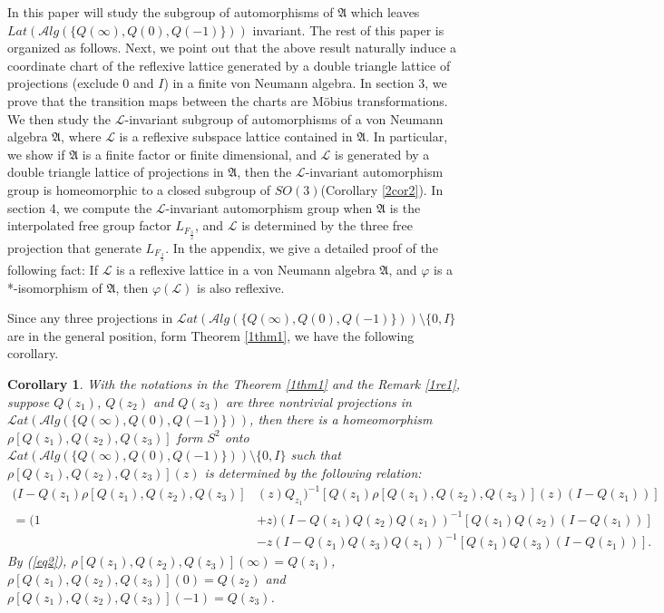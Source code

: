 \documentclass[a4paper,10pt]{amsart}
\newtheorem{corollary}{Corollary}[section]
\newcommand{\AAA}{\mathfrak A}
\newcommand{\LLL}{\mathcal L} %
\newcommand{\Lat}{\mathcal Lat}
\newcommand{\Alg}{\mathcal Alg}
\begin{document}
In this paper will study the subgroup of automorphisms of $\AAA$ which leaves $Lat(\Alg(\{Q(\infty), Q(0), Q(-1)\}))$ invariant.
The rest of this paper is organized as follows.  
Next, we point out that the above result naturally 
induce a coordinate chart of 
the reflexive lattice generated by a double triangle lattice of projections (exclude $0$ and $I$) in a finite von Neumann algebra.
In section 3, we prove that the transition maps between the charts are  
M\"{o}bius transformations.
We then study the $\LLL$-invariant subgroup of automorphisms of  a von Neumann algebra $\AAA$, where $\LLL$ is a
reflexive subspace lattice contained in $\AAA$. In particular, 
we show if $\AAA$ is a finite factor or finite dimensional, and $\LLL$
is generated by a double triangle lattice of projections in 
$\AAA$, then the $\LLL$-invariant automorphism group is 
homeomorphic to a closed 
subgroup of $SO(3)$(Corollary \ref{2cor2}). In section 4, we compute the $\LLL$-invariant automorphism group when $\AAA $ 
is the interpolated free group factor $L_{F_{\frac{3}{2}}}$, 
and $\LLL$ is determined by the three free projection that 
generate $L_{F_{\frac{3}{2}}}$. 
In the appendix, we give a detailed proof of the following fact: 
If $\LLL$ is a reflexive lattice in a von Neumann algebra 
$\AAA$, and $\varphi$ is a *-isomorphism of 
$\AAA$, then $\varphi(\LLL)$ is also reflexive.\newline


Since any three projections in 
$\Lat(\Alg(\{Q(\infty), Q(0), Q(-1)\})) \setminus \{0, I\}$ 
are in the general position, form Theorem \cref{1thm1}, 
we have the following corollary.
\begin{corollary}\label{1cor1}
With the notations in the Theorem \ref{1thm1} and the Remark \ref{1re1}, 
suppose $Q(z_1)$, $Q(z_2)$ and $Q(z_3)$ are three nontrivial 
projections in $\Lat(\Alg(\{Q(\infty), Q(0), Q(-1)\}))$,
then there is a homeomorphism $\rho[Q(z_1), Q(z_2), Q(z_3)]$ form $S^2$ 
onto $\Lat(\Alg(\{Q(\infty), Q(0), Q(-1)\})) \setminus \{0, I\}$ 
such that $\rho[Q(z_1), Q(z_2), Q(z_3)](z)$ is determined by the 
following relation:
\begin{equation}\label{eq2}
\begin{split}
(I - Q(z_1)\rho[Q(z_1), Q(z_2), Q(z_3)]&(z)Q_{z_1})^{-1}
    [Q(z_1)\rho[Q(z_1), Q(z_2), Q(z_3)](z)(I-Q(z_1))]\\
=(1 &+z)(I - Q(z_1)Q(z_2)Q(z_1))^{-1}[Q(z_1)Q(z_2)(I-Q(z_1))] \\
 & - z(I - Q(z_1)Q(z_3)Q(z_1))^{-1}[Q(z_1)Q(z_3)(I-Q(z_1))].
 \end{split}
\end{equation}
By (\ref{eq2}), $\rho[Q(z_1), Q(z_2), Q(z_3)](\infty) = 
Q(z_1)$, $\rho[Q(z_1), Q(z_2), Q(z_3)](0) = Q(z_2)$ 
and $\rho[Q(z_1), Q(z_2), Q(z_3)](-1) = Q(z_3)$. 
\end{corollary}
  
\end{document}

